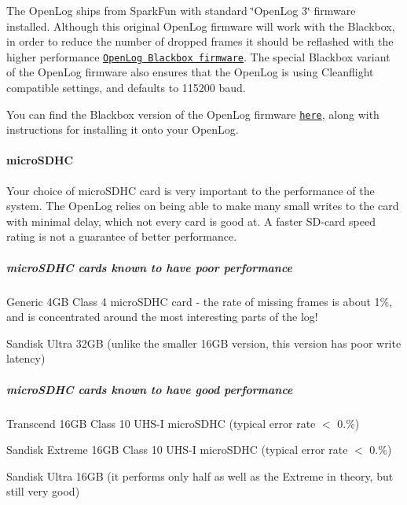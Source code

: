 The Open\+Log ships from Spark\+Fun with standard \char`\"{}\+Open\+Log 3\char`\"{} firmware installed. Although this original Open\+Log firmware will work with the Blackbox, in order to reduce the number of dropped frames it should be reflashed with the higher performance \href{https://github.com/cleanflight/blackbox-firmware}{\tt Open\+Log Blackbox firmware}. The special Blackbox variant of the Open\+Log firmware also ensures that the Open\+Log is using Cleanflight compatible settings, and defaults to 115200 baud.

You can find the Blackbox version of the Open\+Log firmware \href{https://github.com/cleanflight/blackbox-firmware}{\tt here}, along with instructions for installing it onto your Open\+Log.

\paragraph*{micro\+S\+D\+H\+C}

Your choice of micro\+S\+D\+H\+C card is very important to the performance of the system. The Open\+Log relies on being able to make many small writes to the card with minimal delay, which not every card is good at. A faster S\+D-\/card speed rating is not a guarantee of better performance.

\subparagraph*{micro\+S\+D\+H\+C cards known to have poor performance}


\begin{DoxyItemize}
\item Generic 4\+G\+B Class 4 micro\+S\+D\+H\+C card -\/ the rate of missing frames is about 1\%, and is concentrated around the most interesting parts of the log!
\item Sandisk Ultra 32\+G\+B (unlike the smaller 16\+G\+B version, this version has poor write latency)
\end{DoxyItemize}

\subparagraph*{micro\+S\+D\+H\+C cards known to have good performance}


\begin{DoxyItemize}
\item Transcend 16\+G\+B Class 10 U\+H\+S-\/\+I micro\+S\+D\+H\+C (typical error rate $<$ 0.\%)
\item Sandisk Extreme 16\+G\+B Class 10 U\+H\+S-\/\+I micro\+S\+D\+H\+C (typical error rate $<$ 0.\%)
\item Sandisk Ultra 16\+G\+B (it performs only half as well as the Extreme in theory, but still very good)
\end{DoxyItemize}

